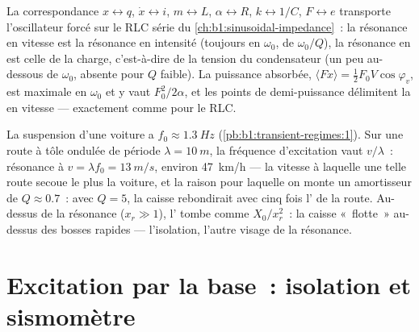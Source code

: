 \begin{remark}\label{rem:b1:oscillators-resonance:analogy}
La correspondance $x \leftrightarrow q$, $\dot x \leftrightarrow i$,
$m \leftrightarrow L$, $\alpha \leftrightarrow R$, $k \leftrightarrow 1/C$,
$F \leftrightarrow e$ transporte l'oscillateur forcé sur le RLC série du
\cref{ch:b1:sinusoidal-impedance}~: la résonance en vitesse est la
résonance en intensité (toujours en $\omega_0$, de 
$\omega_0/Q$), la résonance en  est celle de la charge,
c'est-à-dire de la tension du condensateur (un peu au-dessous de
$\omega_0$, absente pour $Q$ faible). La puissance absorbée, $\langle F\dot x\rangle
= \tfrac12 F_0V\cos\varphi_v$, est maximale en $\omega_0$ et y vaut $F_0^2/2\alpha$,
et les points de demi-puissance délimitent la  en vitesse
--- exactement comme pour le RLC.
\end{remark}

\begin{example}\label{ex:b1:oscillators-resonance:road}
La suspension d'une voiture a $f_0 \approx \qty{1.3}{Hz}$ (\cref{pb:b1:transient-regimes:1}).
Sur une route à tôle ondulée de période $\lambda = \qty{10}{m}$, la
fréquence d'excitation vaut $v/\lambda$~: résonance à
$v = \lambda f_0 = \qty{13}{m/s}$, environ \qty{47}{km/h} --- la vitesse
à laquelle une telle route secoue le plus la voiture, et la raison pour
laquelle on monte un amortisseur de $Q \approx 0.7$~: avec $Q = 5$, la
caisse rebondirait avec cinq fois l' de la route. Au-dessus de
la résonance ($x_r \gg 1$), l' tombe comme
$X_0/x_r^2$~: la caisse «~flotte~» au-dessus des bosses rapides ---
l'isolation, l'autre visage de la résonance.
\end{example}

\section{Excitation par la base~: isolation et sismomètre}

